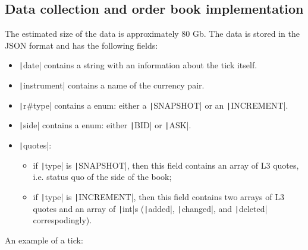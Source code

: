 \begin{appendices} %
    \section{Data collection and  order book implementation}\label{appendix:data}
        The estimated size of the data is approximately 80 Gb. The data is stored in the JSON format and has the following fields:
        \begin{itemize}
            \item \texttt|date| contains a string with an information about the tick itself.
            \item \texttt|instrument| contains a name of the currency pair.
            \item \texttt|r#type| contains a enum: either a \texttt|SNAPSHOT| or an \texttt|INCREMENT|.
            \item \texttt|side| contains a enum: either \texttt|BID| or \texttt|ASK|.
            \item \texttt|quotes|:
                \begin{itemize}
                    \item if \texttt|type| is \texttt|SNAPSHOT|, then this field contains an array of L3 quotes, i.e. status quo of the side of the book;
                    \item if \texttt|type| is \texttt|INCREMENT|, then this field contains two arrays of L3 quotes and an array of \texttt|int|s (\texttt|added|, \texttt|changed|, and \texttt|deleted| correspodingly).
                \end{itemize}
        \end{itemize}
        An example of a tick: \inputminted{json}{codeminted/l3quote.json}


\end{appendices}

